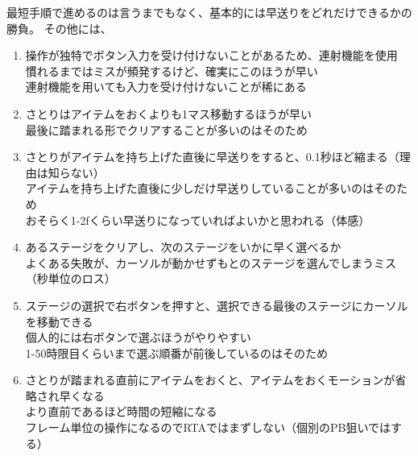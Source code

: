 \clearpage
最短手順で進めるのは言うまでもなく、基本的には早送りをどれだけできるかの勝負。
その他には、
\begin{enumerate}[label={\sarrow}]
\item 操作が独特でボタン入力を受け付けないことがあるため、連射機能を使用\\
      慣れるまではミスが頻発するけど、確実にこのほうが早い\\
      連射機能を用いても入力を受け付けないことが稀にある
\item さとりはアイテムをおくよりも1マス移動するほうが早い\\
      最後に踏まれる形でクリアすることが多いのはそのため
\item さとりがアイテムを持ち上げた直後に早送りをすると、0.1秒ほど縮まる（理由は知らない）\\
      アイテムを持ち上げた直後に少しだけ早送りしていることが多いのはそのため\\
      おそらく1-2fくらい早送りになっていればよいかと思われる（体感）
\item あるステージをクリアし、次のステージをいかに早く選べるか\\
      よくある失敗が、カーソルが動かせずもとのステージを選んでしまうミス（秒単位のロス）
\item ステージの選択で右ボタンを押すと、選択できる最後のステージにカーソルを移動できる\\
      個人的には右ボタンで選ぶほうがやりやすい\\
      1-50時限目くらいまで選ぶ順番が前後しているのはそのため
\item さとりが踏まれる直前にアイテムをおくと、アイテムをおくモーションが省略され早くなる\\
      より直前であるほど時間の短縮になる\\
      フレーム単位の操作になるのでRTAではまずしない（個別のPB狙いではする）
\end{enumerate}



